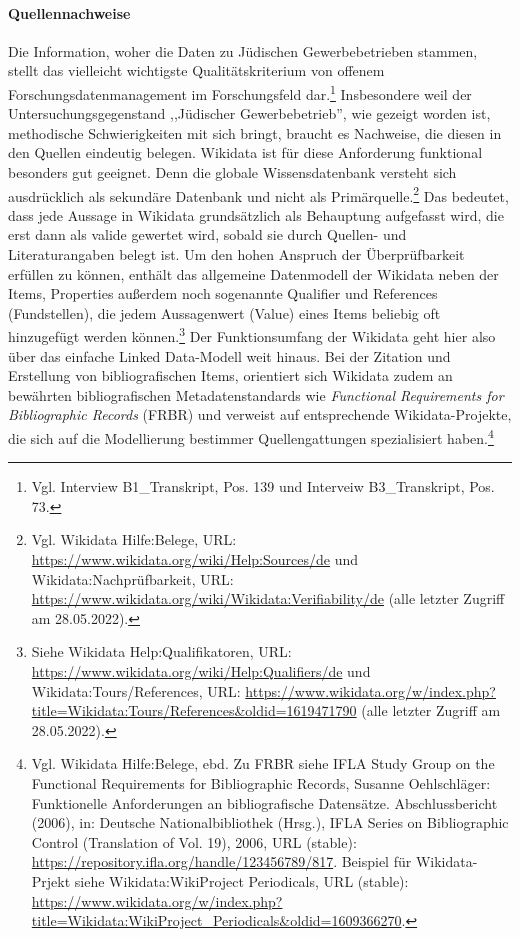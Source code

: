 \paragraph{Quellennachweise}

Die Information, woher die Daten zu Jüdischen Gewerbebetrieben stammen, stellt das vielleicht wichtigste Qualitätskriterium von offenem Forschungsdatenmanagement im Forschungsfeld dar.\footnote{Vgl. Interview B1\_Transkript, Pos. 139 und Interveiw B3\_Transkript, Pos. 73.} Insbesondere weil der Untersuchungsgegenstand ,,Jüdischer Gewerbebetrieb'', wie gezeigt worden ist, methodische Schwierigkeiten mit sich bringt, braucht es Nachweise, die diesen in den Quellen eindeutig belegen. Wikidata ist für diese Anforderung funktional besonders gut geeignet. Denn die globale Wissensdatenbank versteht sich ausdrücklich als sekundäre Datenbank und nicht als Primärquelle.\footnote{Vgl. Wikidata Hilfe:Belege, URL: \url{https://www.wikidata.org/wiki/Help:Sources/de} und Wikidata:Nachprüfbarkeit, URL: \url{https://www.wikidata.org/wiki/Wikidata:Verifiability/de} (alle letzter Zugriff am 28.05.2022).} Das bedeutet, dass jede Aussage in Wikidata grundsätzlich als Behauptung aufgefasst wird, die erst dann als valide gewertet wird, sobald sie durch Quellen- und Literaturangaben belegt ist. Um den hohen Anspruch der Überprüfbarkeit erfüllen zu können, enthält das allgemeine Datenmodell der Wikidata neben der Items, Properties außerdem noch sogenannte Qualifier und References (Fundstellen), die jedem Aussagenwert (Value) eines Items beliebig oft hinzugefügt werden können.\footnote{Siehe Wikidata Help:Qualifikatoren, URL: \url{https://www.wikidata.org/wiki/Help:Qualifiers/de} und Wikidata:Tours/References, URL: \url{https://www.wikidata.org/w/index.php?title=Wikidata:Tours/References&oldid=1619471790} (alle letzter Zugriff am 28.05.2022).} Der Funktionsumfang der Wikidata geht hier also über das einfache Linked Data-Modell weit hinaus. Bei der Zitation und Erstellung von bibliografischen Items, orientiert sich Wikidata zudem an bewährten bibliografischen Metadatenstandards wie \textit{Functional Requirements for Bibliographic Records} (FRBR) und verweist auf entsprechende Wikidata-Projekte, die sich auf die Modellierung bestimmer Quellengattungen spezialisiert haben.\footnote{Vgl. Wikidata Hilfe:Belege, ebd. Zu FRBR siehe IFLA Study Group on the Functional Requirements for Bibliographic Records, Susanne Oehlschläger: Funktionelle Anforderungen an bibliografische Datensätze. Abschlussbericht (2006), in: Deutsche Nationalbibliothek (Hrsg.), IFLA Series on Bibliographic Control (Translation of Vol. 19), 2006, URL (stable): \url{https://repository.ifla.org/handle/123456789/817}. Beispiel für Wikidata-Prjekt siehe Wikidata:WikiProject Periodicals, URL (stable): \url{https://www.wikidata.org/w/index.php?title=Wikidata:WikiProject_Periodicals&oldid=1609366270}.} 

